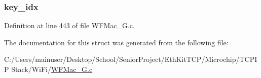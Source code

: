 \subsubsection[{key\+\_\+idx}]{ key\+\_\+idx}\label{structsec__wep40_af9aac195765cf2f2eb0b857c99c96a74}


Definition at line 443 of file W\+F\+Mac\+\_\+G.\+c.



The documentation for this struct was generated from the following file\+:\begin{DoxyCompactItemize}
\item 
C\+:/\+Users/mainuser/\+Desktop/\+School/\+Senior\+Project/\+Eth\+Kit\+T\+C\+P/\+Microchip/\+T\+C\+P\+I\+P Stack/\+Wi\+Fi/\hyperlink{_w_f_mac__24_g_8c}{W\+F\+Mac\+\_\+G.\+c}\end{DoxyCompactItemize}
